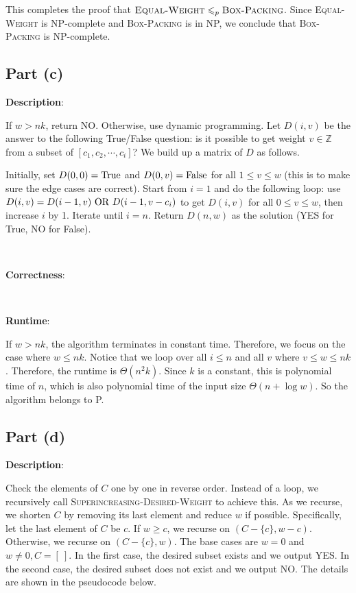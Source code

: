 \documentclass{article}
\begin{document}
This completes the proof that $\textsc{Equal-Weight}\leqslant_p\textsc{Box-Packing}$. Since \textsc{Equal-Weight} is NP-complete and \textsc{Box-Packing} is in NP, we conclude that \textsc{Box-Packing} is NP-complete.

\subsection{Part (c)}
\noindent\textbf{Description}:

If $w>nk$, return NO. Otherwise, use dynamic programming. Let $D(i,v)$ be the answer to the following True/False question: is it possible to get weight $v\in\mathbb{Z}$ from a subset of $[c_1,c_2,\cdots,c_i]$? We build up a matrix of $D$ as follows.

Initially, set $D(0,0)=\textup{True}$ and $D(0,v)=\textup{False}$ for all $1\leqslant v\leqslant w$ (this is to make sure the edge cases are correct). Start from $i=1$ and do the following loop: use $D(i,v)=D(i-1,v)\textup{ OR }D(i-1,v-c_i)$ to get $D(i,v)$ for all $0\leqslant v\leqslant w$, then increase $i$ by 1. Iterate until $i=n$. Return $D(n,w)$ as the solution (YES for True, NO for False).

~

\noindent\textbf{Correctness}:

~

\noindent\textbf{Runtime}:

If $w>nk$, the algorithm terminates in constant time. Therefore, we focus on the case where $w\leqslant nk$. Notice that we loop over all $i\leqslant n$ and all $v$ where $v\leqslant w\leqslant nk$. Therefore, the runtime is $\Theta(n^2k)$. Since $k$ is a constant, this is polynomial time of $n$, which is also polynomial time of the input size $\Theta(n+\log w)$. So the algorithm belongs to P.

\subsection{Part (d)}
\noindent\textbf{Description}:

Check the elements of $C$ one by one in reverse order. Instead of a loop, we recursively call \textsc{Superincreasing-Desired-Weight} to achieve this. As we recurse, we shorten $C$ by removing its last element and reduce $w$ if possible. Specifically, let the last element of $C$ be $c$. If $w\geqslant c$, we recurse on $(C-\{c\},w-c)$. Otherwise, we recurse on $(C-\{c\},w)$. The base cases are $w=0$ and $w\neq0,C=[~]$. In the first case, the desired subset exists and we output YES. In the second case, the desired subset does not exist and we output NO. The details are shown in the pseudocode below.
\end{document}
